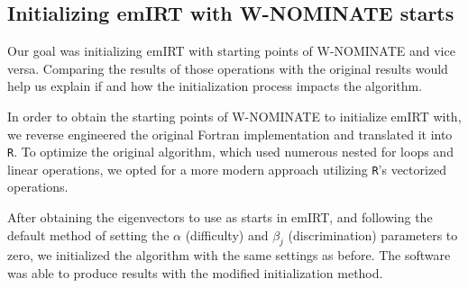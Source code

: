 \documentclass[a4paper,12pt]{report}
\begin{document}
            \subsection{Initializing emIRT with W-NOMINATE starts}
                \label{subsec:initializing-emirt-with-w-nominate-starts}
                Our goal was initializing emIRT with starting points of W-NOMINATE and vice versa. Comparing the results
                of
                those operations with the original results would help us explain if and how the initialization process
                impacts
                the algorithm.

                In order to obtain the starting points of W-NOMINATE to initialize emIRT with, we reverse engineered the
                original Fortran implementation and translated it into \texttt{R}.
                To optimize the original algorithm, which used
                numerous nested for loops and linear operations, we opted for a more modern approach utilizing
                \texttt{R}'s
                vectorized operations.

                After obtaining the eigenvectors to use as starts in emIRT, and following the default method of setting
                the
                \(\alpha\) (difficulty) and \(\beta_j\)
                (discrimination) parameters to zero, we initialized the algorithm with the same settings as before. The
                software
                was able to produce results with the modified initialization method.
\end{document}
